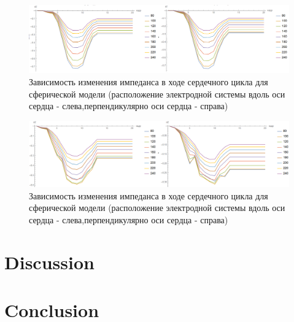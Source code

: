 \documentclass[conference]{IEEEtran}
\begin{document}
\begin{figure}[tbph]
    \centering
    \includegraphics[width=\linewidth]{fig/sphere}
    \caption{Зависимость изменения импеданса в ходе сердечного цикла для сферической модели (расположение электродной системы вдоль оси сердца - слева,перпендикулярно оси сердца - справа)}
    \label{fig:sphere}
\end{figure}

\begin{figure}[tbph]
    \centering
    \includegraphics[width=\linewidth]{ellipse}
    \caption{Зависимость изменения импеданса в ходе сердечного цикла для сферической модели (расположение электродной системы вдоль оси сердца - слева,перпендикулярно оси сердца - справа)}
    \label{fig:ellipse}
\end{figure}



\section{Discussion}



\section{Conclusion}

\end{document}

